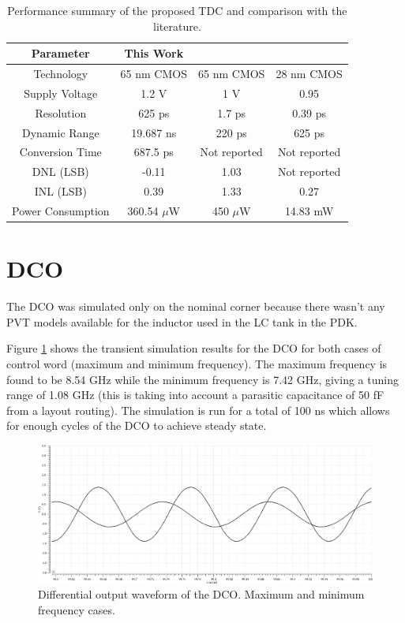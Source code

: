 \begin{table}[H]
    \centering
    \caption{Performance summary of the proposed TDC and comparison with the literature.}
    \label{tab:TDC_performance_summary}
    \begin{tabular}{|c|c|c|c|}
        \hline
        Parameter & This Work & \cite{MohammadAmin2022} & \cite{Meng2025}\\
        \hline
        Technology & 65 nm CMOS & 65 nm CMOS & 28 nm CMOS \\
        Supply Voltage & 1.2 V & 1 V & 0.95 \\
        Resolution & 625 ps & 1.7 ps & 0.39 ps\\
        Dynamic Range & 19.687 ns & 220 ps & 625 ps \\
        Conversion Time & 687.5 ps & Not reported &  Not reported \\
        DNL (LSB) & -0.11 & 1.03 & Not reported \\
        INL (LSB) & 0.39 & 1.33 & 0.27 \\
        Power Consumption & 360.54 $\mu$W & 450 $\mu$W & 14.83 mW \\
        \hline
    \end{tabular}
\end{table}

\section{DCO}
The DCO was simulated only on the nominal corner because there wasn't any PVT models available for the inductor used in the LC tank in the PDK.

Figure \ref{fig:DCO_TRAN} shows the transient simulation results for the DCO for both cases of control word (maximum and minimum frequency). The maximum frequency is found to be
8.54 GHz while the minimum frequency is 7.42 GHz, giving a tuning range of 1.08 GHz (this is taking into account a parasitic capacitance of 50 fF from a layout routing). The simulation
is run for a total of 100 ns which allows for enough cycles of the DCO to achieve steady state.

\begin{figure}[H]
    \centering
    \includegraphics[width=1\textwidth]{figures/DCO_TRAN.png}
    \caption{Differential output waveform of the DCO. Maximum and minimum frequency cases.}
    \label{fig:DCO_TRAN}
\end{figure}

